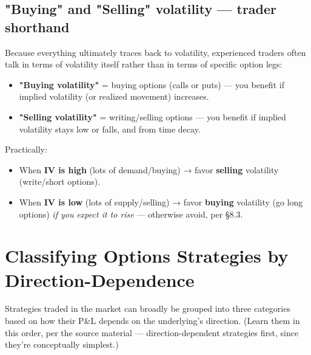 \documentclass[12pt,openany]{book}
\theoremstyle{definition}
\theoremstyle{remark}
\begin{document}
\subsection{"Buying" and "Selling" volatility — trader shorthand}

Because everything ultimately traces back to volatility, experienced traders often talk in terms of volatility itself rather than in terms of specific option legs:

\begin{itemize}
\item \textbf{"Buying volatility"} = buying options (calls or puts) — you benefit if implied volatility (or realized movement) increases.
\item \textbf{"Selling volatility"} = writing/selling options — you benefit if implied volatility stays low or falls, and from time decay.
\end{itemize}

Practically:
\begin{itemize}
\item When \textbf{IV is high} (lots of demand/buying) → favor \textbf{selling} volatility (write/short options).
\item When \textbf{IV is low} (lots of supply/selling) → favor \textbf{buying} volatility (go long options) \emph{if you expect it to rise} — otherwise avoid, per \S{}8.3.
\end{itemize}


\section{Classifying Options Strategies by Direction-Dependence}

Strategies traded in the market can broadly be grouped into three categories based on how their P\&L depends on the underlying's direction. (Learn them in this order, per the source material — direction-dependent strategies first, since they're conceptually simplest.)
\end{document}

